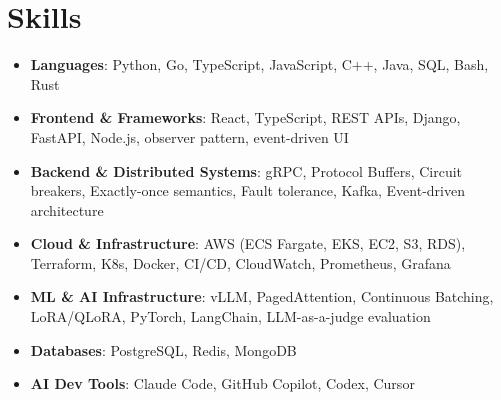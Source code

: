 \documentclass[letterpaper,11pt]{article}
\newcommand{\resumeSubHeadingListStart}{\begin{itemize}[leftmargin=0.15in, label={}]}
\newcommand{\resumeSubHeadingListEnd}{\end{itemize}}
\newcommand{\resumeSkillHeading}[2]{%
  \item\small{\textbf{#1}: #2 \vspace{-9pt}}%
}
\begin{document}
\section{Skills}
  \resumeSubHeadingListStart
    \resumeSkillHeading{Languages}{Python, Go, TypeScript, JavaScript, C++, Java, SQL, Bash, Rust}
    \resumeSkillHeading{Frontend \& Frameworks}{React, TypeScript, REST APIs, Django, FastAPI, Node.js, observer pattern, event-driven UI}
    \resumeSkillHeading{Backend \& Distributed Systems}{gRPC, Protocol Buffers, Circuit breakers, Exactly-once semantics, Fault tolerance, Kafka, Event-driven architecture}
    \resumeSkillHeading{Cloud \& Infrastructure}{AWS (ECS Fargate, EKS, EC2, S3, RDS), Terraform, K8s, Docker, CI/CD, CloudWatch, Prometheus, Grafana}
    \resumeSkillHeading{ML \& AI Infrastructure}{vLLM, PagedAttention, Continuous Batching, LoRA/QLoRA, PyTorch, LangChain, LLM-as-a-judge evaluation}
    \resumeSkillHeading{Databases}{PostgreSQL, Redis, MongoDB}
    \resumeSkillHeading{AI Dev Tools}{Claude Code, GitHub Copilot, Codex, Cursor}
  \resumeSubHeadingListEnd
\end{document}
